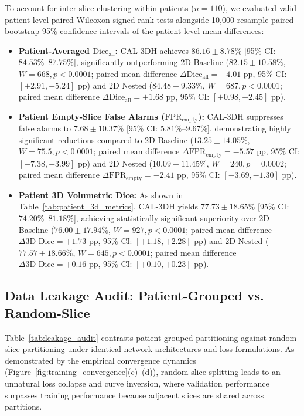 \documentclass[preprint,12pt,authoryear]{elsarticle}
\begin{document}
To account for inter-slice clustering within patients ($n=110$), we evaluated valid patient-level paired Wilcoxon signed-rank tests alongside 10,000-resample paired bootstrap 95\% confidence intervals of the patient-level mean differences:
\begin{itemize}
\item \textbf{Patient-Averaged $\text{Dice}_{\text{all}}$:} CAL-3DH achieves $86.16 \pm 8.78\%$ [95\% CI: $84.53\%$--$87.75\%$], significantly outperforming 2D Baseline ($82.15 \pm 10.58\%$, $W=668, p < 0.0001$; paired mean difference $\Delta\text{Dice}_{\text{all}} = +4.01\text{ pp}$, 95\% CI: $[+2.91, +5.24]\text{ pp}$) and 2D Nested ($84.48 \pm 9.33\%$, $W=687, p < 0.0001$; paired mean difference $\Delta\text{Dice}_{\text{all}} = +1.68\text{ pp}$, 95\% CI: $[+0.98, +2.45]\text{ pp}$).
\item \textbf{Patient Empty-Slice False Alarms ($\text{FPR}_{\text{empty}}$):} CAL-3DH suppresses false alarms to $7.68 \pm 10.37\%$ [95\% CI: $5.81\%$--$9.67\%$], demonstrating highly significant reductions compared to 2D Baseline ($13.25 \pm 14.05\%$, $W=75.5, p < 0.0001$; paired mean difference $\Delta\text{FPR}_{\text{empty}} = -5.57\text{ pp}$, 95\% CI: $[-7.38, -3.99]\text{ pp}$) and 2D Nested ($10.09 \pm 11.45\%$, $W=240, p = 0.0002$; paired mean difference $\Delta\text{FPR}_{\text{empty}} = -2.41\text{ pp}$, 95\% CI: $[-3.69, -1.30]\text{ pp}$).
\item \textbf{Patient 3D Volumetric Dice:} As shown in Table~\ref{tab:patient_3d_metrics}, CAL-3DH yields $77.73 \pm 18.65\%$ [95\% CI: $74.20\%$--$81.18\%$], achieving statistically significant superiority over 2D Baseline ($76.00 \pm 17.94\%$, $W=927, p < 0.0001$; paired mean difference $\Delta\text{3D Dice} = +1.73\text{ pp}$, 95\% CI: $[+1.18, +2.28]\text{ pp}$) and 2D Nested ($77.57 \pm 18.66\%$, $W=645, p < 0.0001$; paired mean difference $\Delta\text{3D Dice} = +0.16\text{ pp}$, 95\% CI: $[+0.10, +0.23]\text{ pp}$).
\end{itemize}

\subsection{Data Leakage Audit: Patient-Grouped vs. Random-Slice}
\label{sec:leakage_audit}
Table~\ref{tab:leakage_audit} contrasts patient-grouped partitioning against random-slice partitioning under identical network architectures and loss formulations. As demonstrated by the empirical convergence dynamics (Figure~\ref{fig:training_convergence}(c)--(d)), random slice splitting leads to an unnatural loss collapse and curve inversion, where validation performance surpasses training performance because adjacent slices are shared across partitions.
\end{document}
